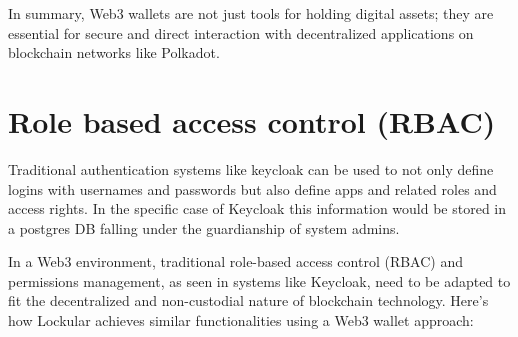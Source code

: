 \documentclass{tufte-handout}
\begin{document}
 In summary, Web3 wallets are not just tools for holding digital assets; they are essential for secure and direct interaction with decentralized applications on blockchain networks
 like Polkadot.

 \section{Role based access control (RBAC)}\label{sec:page-layout}
 Traditional authentication systems like keycloak can be used to not only define logins with usernames and passwords but also define apps and related roles and access rights. In the
 specific case of Keycloak this information would be stored in a postgres DB falling under the guardianship of system admins.

 In a Web3 environment, traditional role-based access control (RBAC) and permissions management, as seen in systems like Keycloak, need to be adapted to fit the decentralized and
 non-custodial nature of blockchain technology. Here's how Lockular achieves similar functionalities using a Web3 wallet approach:
\end{document}
